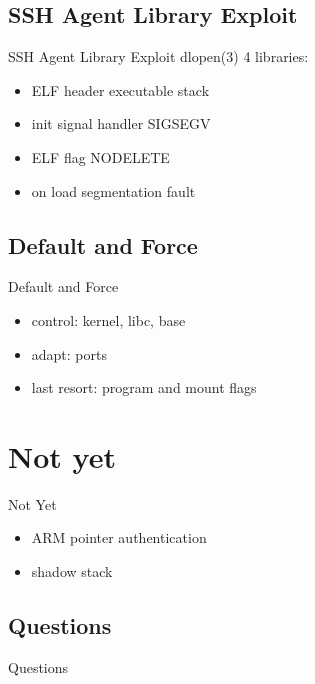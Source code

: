\documentclass[14pt,aspectratio=169]{beamer}
\begin{document}
\subsection{SSH Agent Library Exploit}
\begin{frame}{SSH Agent Library Exploit}
dlopen(3) 4 libraries:
\begin{itemize}
  \item ELF header executable stack 
  \item init signal handler SIGSEGV
  \item ELF flag NODELETE
  \item on load segmentation fault
\end{itemize}
\end{frame}

\subsection{Default and Force}
\begin{frame}{Default and Force}
\begin{itemize}
  \item control: kernel, libc, base
  \item adapt: ports
  \item last resort: program and mount flags
\end{itemize}
\end{frame}


\section{Not yet}
\begin{frame}{Not Yet}
\begin{itemize}
  \item ARM pointer authentication
  \item shadow stack
\end{itemize}
\end{frame}

\subsection{Questions}
\begin{frame}{Questions}
\begin{center}
\end{center}
\end{frame}
\end{document}
